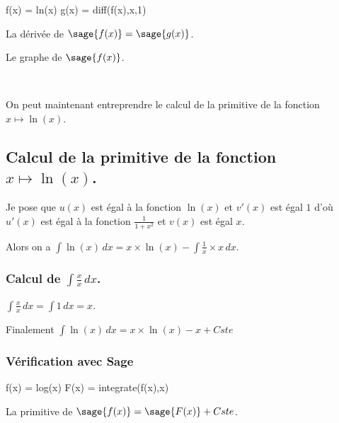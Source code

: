 \documentclass[a4paper,14pt]{extreport} %
\begin{document}
\begin{sageblock}
    f(x) = ln(x)
    g(x) = diff(f(x),x,1)
\end{sageblock}

La dérivée de $\sage{f(x)} = \sage{g(x)} $.

Le graphe de $\sage{f(x)} $.


\begin{center}
 \\
\end{center}







On peut maintenant entreprendre le calcul de la primitive de la  fonction  $x \mapsto \ln(x) $.






\subsection{Calcul de la primitive de la fonction  $x \mapsto \ln(x) $.}


Je pose que $u(x)$  est égal à la fonction $\ln(x)$ et $v'(x)$ est égal $1$  d'où $u'(x)$  est égal à la fonction $ \frac{1}{1+ x^2} $ et $v(x)$ est égal $x$.

Alors on a $\int \ln(x) \, dx = x \times \ln(x) -\int \frac{1}{x} \times x \, dx $.


\subsubsection{Calcul de $\int \frac{x}{x} \, dx $.}

$\int \frac{x}{x} \, dx = \int 1 \, dx = x$.


Finalement $\int \ln(x) \, dx = x \times \ln(x) -x + Cste $

\subsubsection{Vérification avec Sage}

\begin{sageblock}
    f(x) = log(x)
    F(x) = integrate(f(x),x)
\end{sageblock}

La primitive de $\sage{f(x)} = \sage{F(x)} + Cste  $.
\end{document}
